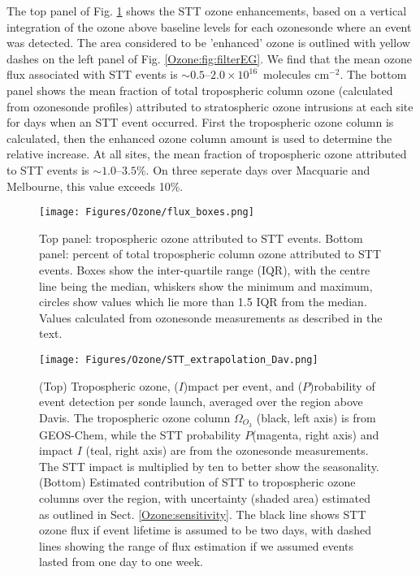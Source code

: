     The top panel of Fig. \ref{Ozone:fig:fluxsummary} shows the STT ozone enhancements, based on a vertical integration of the ozone above baseline levels for each ozonesonde where an event was detected.
    The area considered to be 'enhanced' ozone is outlined with yellow dashes on the left panel of Fig. \ref{Ozone:fig:filterEG}.
    We find that the mean ozone flux associated with STT events is $\sim 0.5$--$2.0 \times 10^{16}$~molecules cm$^{-2}$.
    The bottom panel shows the mean fraction of total tropospheric column ozone (calculated from ozonesonde profiles) attributed to stratospheric ozone intrusions at each site for days when an STT event occurred.
    First the tropospheric ozone column is calculated, then the enhanced ozone column amount is used to determine the relative increase.
    At all sites, the mean fraction of tropospheric ozone attributed to STT events is $\sim 1.0$--$3.5\%$.
    On three seperate days over Macquarie and Melbourne, this value exceeds 10\%.
    
    \begin{figure}
      \texttt{[image: Figures/Ozone/flux\_boxes.png]}
      \caption{%
        Top panel: tropospheric ozone attributed to STT events.
        Bottom panel: percent of total tropospheric column ozone attributed to STT events.
        Boxes show the inter-quartile range (IQR), with the centre line being the median, whiskers show the minimum and maximum, circles show values which lie more than 1.5 IQR from the median.
        Values calculated from ozonesonde measurements as described in the text.}
      \label{Ozone:fig:fluxsummary}
    \end{figure}
    
    
    \begin{figure}
      \texttt{[image: Figures/Ozone/STT\_extrapolation\_Dav.png]}
      \caption{%
        (Top) Tropospheric ozone, ($I$)mpact per event, and ($P$)robability of event detection per sonde launch, averaged over the region above Davis.
        The tropospheric ozone column $\Omega_{O_3}$ (black, left axis) is from GEOS-Chem, while the STT probability  $P$(magenta, right axis) and impact $I$ (teal, right axis) are from the ozonesonde measurements.
        The STT impact is multiplied by ten to better show the seasonality.
        (Bottom) Estimated contribution of STT to tropospheric ozone columns over the region, with uncertainty (shaded area) estimated as outlined in Sect. \ref{Ozone:sensitivity}.
        The black line shows STT ozone flux if event lifetime is assumed to be two days, with dashed lines showing the range of flux estimation if we assumed events lasted from one day to one week.}
      \label{Ozone:fig:DavExtrapolation}
    \end{figure}
    

